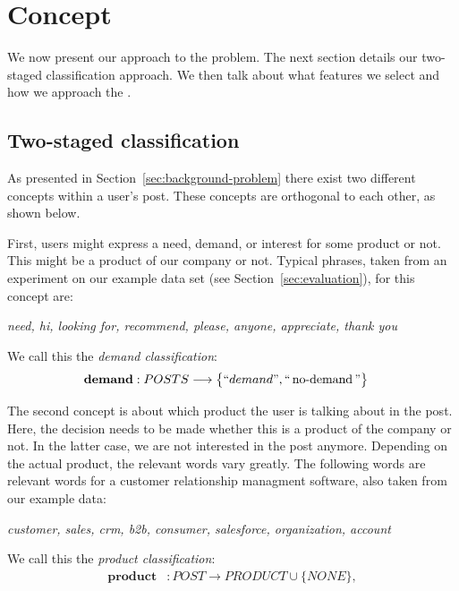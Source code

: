 \section{Concept}
\label{sec:concept}

We now present our approach to the \nto problem.
The next section details our two-staged classification approach.
We then talk about what features we select and how we approach the .

\subsection{Two-staged classification}
As presented in Section~\ref{sec:background-problem} there exist two different concepts within a user's post.
These concepts are orthogonal to each other, as shown below.

First, users might express a need, demand, or interest for some product or not.
This might be a product of our company or not.
Typical phrases, taken from an experiment on our example data set (see Section~\ref{sec:evaluation}), for this concept are:
\begin{center}
	\textit{need, hi, looking for, recommend, please, anyone, appreciate, thank you}
\end{center}
We call this the \emph{demand classification}:
\begin{align}
	\mathbf{demand}&: POSTS \longrightarrow \big\{ ``demand", ``\operatorname{no-demand}" \big\}
\end{align}

The second concept is about which product the user is talking about in the post.
Here, the decision needs to be made whether this is a product of the company or not.
In the latter case, we are not interested in the post anymore.
Depending on the actual product, the relevant words vary greatly.
The following words are relevant words for a customer relationship managment software, also taken from our example data:
\begin{center}
	\textit{customer, sales, crm, b2b, consumer, salesforce, organization, account}
\end{center}

We call this the \emph{product classification}:
\begin{align}
	\mathbf{product}&: POST \longrightarrow  PRODUCT \cup \big\{ NONE \big\}, \\
\end{align}


